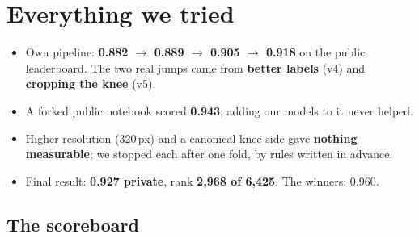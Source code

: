 \chapter{Everything we tried}
\label{ch:experiments}

\begin{tldr}
\begin{itemize}
\item Own pipeline: \textbf{0.882 $\rightarrow$ 0.889 $\rightarrow$ 0.905 $\rightarrow$ 0.918} on the public leaderboard. The two
      real jumps came from \textbf{better labels} (v4) and \textbf{cropping the knee} (v5).
\item A forked public notebook scored \textbf{0.943}; adding our models to it never helped.
\item Higher resolution (320\,px) and a canonical knee side gave \textbf{nothing measurable}; we stopped each after one
      fold, by rules written in advance.
\item Final result: \textbf{0.927 private}, rank \textbf{2,968 of 6,425}. The winners: 0.960.
\end{itemize}
\end{tldr}

\section{The scoreboard}

